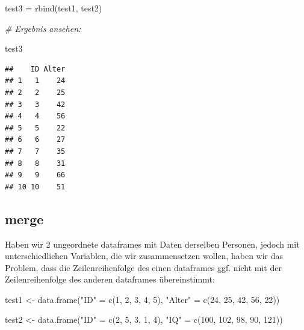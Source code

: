 \documentclass[
]{book}
\newenvironment{Shaded}{\begin{snugshade}}{\end{snugshade}}
\newcommand{\CommentTok}[1]{\textcolor[rgb]{0.56,0.35,0.01}{\textit{#1}}}
\newcommand{\DecValTok}[1]{\textcolor[rgb]{0.00,0.00,0.81}{#1}}
\newcommand{\FunctionTok}[1]{\textcolor[rgb]{0.00,0.00,0.00}{#1}}
\newcommand{\NormalTok}[1]{#1}
\newcommand{\OtherTok}[1]{\textcolor[rgb]{0.56,0.35,0.01}{#1}}
\newcommand{\StringTok}[1]{\textcolor[rgb]{0.31,0.60,0.02}{#1}}
\begin{document}
\begin{Shaded}
\begin{Highlighting}[]
\NormalTok{test3 }\OtherTok{=} \FunctionTok{rbind}\NormalTok{(test1, test2)}

\CommentTok{\# Ergebnis ansehen:}

\NormalTok{test3}
\end{Highlighting}
\end{Shaded}

\begin{verbatim}
##    ID Alter
## 1   1    24
## 2   2    25
## 3   3    42
## 4   4    56
## 5   5    22
## 6   6    27
## 7   7    35
## 8   8    31
## 9   9    66
## 10 10    51
\end{verbatim}

\hypertarget{merge}{%
\subsection{merge}\label{merge}}

Haben wir 2 ungeordnete dataframes mit Daten derselben Personen, jedoch mit unterschiedlichen Variablen, die wir zusammensetzen wollen, haben wir das Problem, dass die Zeilenreihenfolge des einen dataframes ggf. nicht mit der Zeilenreihenfolge des anderen dataframes übereinstimmt:

\begin{Shaded}
\begin{Highlighting}[]
\NormalTok{test1 }\OtherTok{\textless{}{-}} \FunctionTok{data.frame}\NormalTok{(}\StringTok{"ID"} \OtherTok{=} \FunctionTok{c}\NormalTok{(}\DecValTok{1}\NormalTok{, }\DecValTok{2}\NormalTok{, }\DecValTok{3}\NormalTok{, }\DecValTok{4}\NormalTok{, }\DecValTok{5}\NormalTok{),}
                    \StringTok{"Alter"} \OtherTok{=} \FunctionTok{c}\NormalTok{(}\DecValTok{24}\NormalTok{, }\DecValTok{25}\NormalTok{, }\DecValTok{42}\NormalTok{, }\DecValTok{56}\NormalTok{, }\DecValTok{22}\NormalTok{))}

\NormalTok{test2 }\OtherTok{\textless{}{-}} \FunctionTok{data.frame}\NormalTok{(}\StringTok{"ID"} \OtherTok{=} \FunctionTok{c}\NormalTok{(}\DecValTok{2}\NormalTok{, }\DecValTok{5}\NormalTok{, }\DecValTok{3}\NormalTok{, }\DecValTok{1}\NormalTok{, }\DecValTok{4}\NormalTok{),}
                    \StringTok{"IQ"} \OtherTok{=} \FunctionTok{c}\NormalTok{(}\DecValTok{100}\NormalTok{, }\DecValTok{102}\NormalTok{, }\DecValTok{98}\NormalTok{, }\DecValTok{90}\NormalTok{, }\DecValTok{121}\NormalTok{))}
\end{Highlighting}
\end{Shaded}
\end{document}
